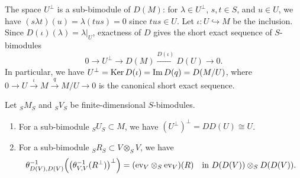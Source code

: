 The space $U^\perp$ is a sub-bimodule of $D(M)$: for $\lambda\in U^\perp$, $s,t\in S$, and $u\in U$, we have $(s\lambda t)(u)=\lambda(tus)=0$ since $tus\in U$.
Let $\iota:U\hookrightarrow M$ be the inclusion.
Since $D(\iota)(\lambda)=\lambda|_U$, exactness of $D$ gives the short exact sequence of $S$-bimodules
\begin{equation}\label{eq:orthogonal-exact}
0\longrightarrow U^\perp\longrightarrow D(M)\xrightarrow{D(\iota)}D(U)\longrightarrow0.
\end{equation}
In particular, we have $U^\perp =\operatorname{Ker}\nolimits D(\iota)=\operatorname{Im}\nolimits D(q)=D(M/U)$, where $0\to U\xrightarrow{\iota} M \xrightarrow{q} M/U\to 0$ is the canonical short exact sequence.


\begin{lemma}\label{lem:double-orthogonal}
Let ${}_SM_S$ and ${}_SV_S$ be finite-dimensional $S$-bimodules.
\begin{enumerate}
\item For a sub-bimodule ${}_SU_S\subset M$, we have  $(U^\perp)^\perp=DD(U) \cong U$.

\item For a sub-bimodule ${}_SR_S\subset V\otimes_SV$, we have
\[
\theta_{D(V),D(V)}^{-1}\Bigl(\bigl(\theta_{V,V}^{-1}(R^\perp)\bigr)^\perp\Bigr)=(\mathrm{ev}_V\otimes_S\mathrm{ev}_V)(R)
\quad\text{in }D(D(V))\otimes_SD(D(V)).
\]
\end{enumerate}
\end{lemma}

